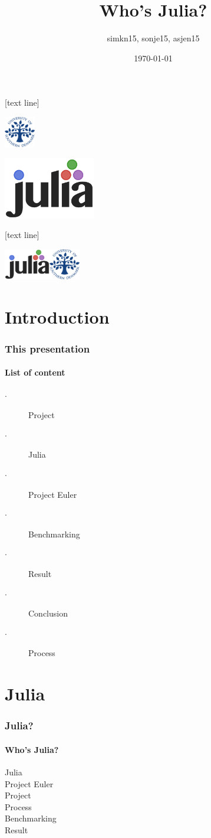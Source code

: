 \documentclass[t]{beamer}
\title{Who's Julia?}
\author[simkn15, sonje15, asjen15]{simkn15, sonje15, asjen15}
\institute[Inst.]{\vspace*{-0.8cm}University of Southern Denmark}
\date{\vspace*{-0.8cm}\today}
\begin{document}
[text line]{
	\parbox{\linewidth}{\vspace*{-60pt}\hfill\includegraphics[width=1.352cm,height=1.352cm]{img/sdu_segl.pdf}}}

	\begin{frame}
		\center
		\includegraphics[height=2.704cm,width=4cm]{img/julia_small.png}
		\vspace*{-0.8cm}
		\maketitle
	\end{frame}
	
%
	
[text line]{
	\parbox{\linewidth}{\vspace*{-60pt}\includegraphics[height=1.352cm,width=2cm]{img/julia_200.png}\hfill\insertpagenumber\hfill\includegraphics[width=1.352cm,height=1.352cm]{img/sdu_segl.pdf}}}
	\section{Introduction}
	\begin{frame}
		\frametitle{This presentation}
		\framesubtitle{List of content}
		\begin{description}
			\item[$\cdot$] Project %
			\item[$\cdot$] Julia %
			\item[$\cdot$] Project Euler %
			\item[$\cdot$] Benchmarking %
			\item[$\cdot$] Result %
			\item[$\cdot$] Conclusion
			\item[$\cdot$] Process %
		\end{description}
	\end{frame}
	\section{Julia}
	\begin{frame}
		\frametitle{Julia?}
		\framesubtitle{Who's Julia?}
		Julia \\
		Project Euler \\
		Project \\
		Process \\
		Benchmarking \\
		Result 
	\end{frame}
\end{document}
